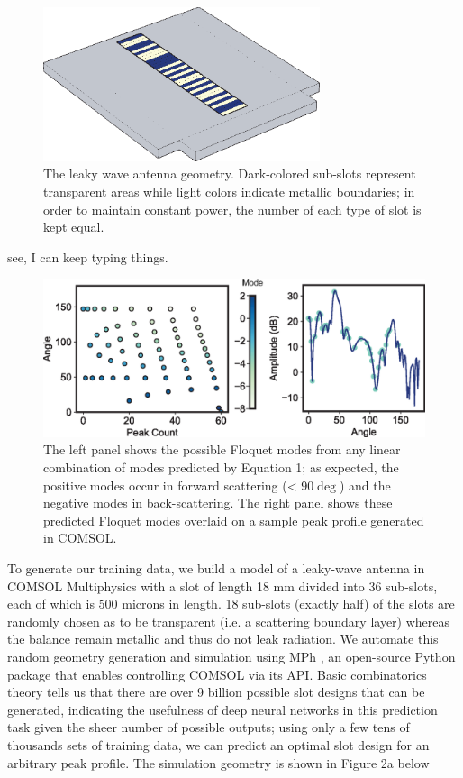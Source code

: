 \documentclass[11pt]{article}
\begin{document}
\begin{figure}
		\centering
		\includegraphics[width = 3.2in]{figures/fig5.eps}
		\caption{The leaky wave antenna geometry. Dark-colored sub-slots represent transparent areas while light colors indicate metallic boundaries; in order to maintain constant power, the number of each type of slot is kept equal.}
\end{figure}

\noindent see, I can keep typing things.


\begin{figure}[H]
	\centering
	\includegraphics[width=6in]{figures/fig4_labeled2.eps}
	\caption{The left panel shows the possible Floquet modes from any linear combination of modes predicted by Equation 1; as expected, the positive modes occur in forward scattering (< 90$\deg$) and the negative modes in back-scattering. The right panel shows these predicted Floquet modes overlaid on a sample peak profile generated in COMSOL.}
\end{figure}


\noindent To generate our training data, we build a model of a leaky-wave antenna in COMSOL Multiphysics with a slot of length 18 mm divided into 36 sub-slots, each of which is 500 microns in length. 18 sub-slots (exactly half) of the slots are randomly chosen as to be transparent (i.e. a scattering boundary layer) whereas the balance remain metallic and thus do not leak radiation. We automate this random geometry generation and simulation using MPh \cite{john_hennig_2022_6312347}, an open-source Python package that enables controlling COMSOL via its API. Basic combinatorics theory tells us that there are over 9 billion possible slot designs that can be generated, indicating the usefulness of deep neural networks in this prediction task given the sheer number of possible outputs; using only a few tens of thousands sets of training data, we can predict an optimal slot design for an arbitrary peak profile. The simulation geometry is shown in Figure 2a below \\
\end{document}
